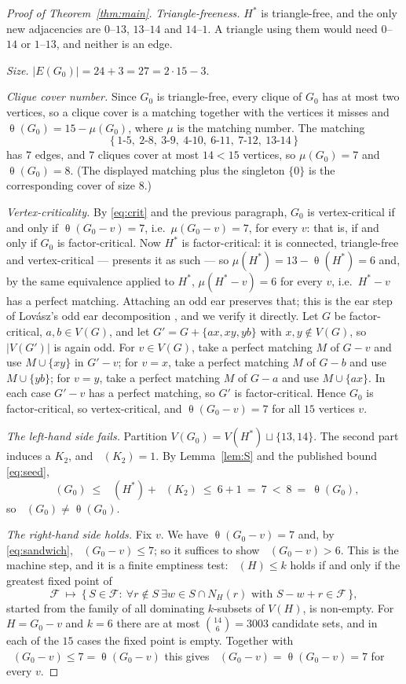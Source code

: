 \documentclass[11pt]{amsart}
\theoremstyle{remark}
\DeclareMathOperator{\edom}{\gamma^{\infty}}
\DeclareMathOperator{\thet}{\theta}
\newcommand{\Gz}{G_0}
\newcommand{\Hs}{H^{*}}
\begin{document}
\begin{proof}[Proof of Theorem~\ref{thm:main}]
\emph{Triangle-freeness.} $\Hs$ is triangle-free, and the only new adjacencies are $0$--$13$,
$13$--$14$ and $14$--$1$. A triangle using them would need $0$--$14$ or $1$--$13$, and neither is
an edge.

\emph{Size.} $|E(\Gz)|=24+3=27=2\cdot 15-3$.

\emph{Clique cover number.} Since $\Gz$ is triangle-free, every clique of $\Gz$ has at most two
vertices, so a clique cover is a matching together with the vertices it misses and
$\thet(\Gz)=15-\mu(\Gz)$, where $\mu$ is the matching number. The matching
\[
  \{\,1\text{-}5,\ 2\text{-}8,\ 3\text{-}9,\ 4\text{-}10,\ 6\text{-}11,\ 7\text{-}12,\
  13\text{-}14\,\}
\]
has $7$ edges, and $7$ cliques cover at most $14<15$ vertices, so $\mu(\Gz)=7$ and
$\thet(\Gz)=8$. (The displayed matching plus the singleton $\{0\}$ is the corresponding cover of
size $8$.)

\emph{Vertex-criticality.} By \eqref{eq:crit} and the previous paragraph, $\Gz$ is
vertex-critical if and only if $\thet(\Gz-v)=7$, i.e.\ $\mu(\Gz-v)=7$, for every $v$: that is,
if and only if $\Gz$ is factor-critical. Now $\Hs$ is factor-critical: it is connected,
triangle-free and vertex-critical --- \cite[Figure 2.1]{KMS} presents it as such --- so
$\mu(\Hs)=13-\thet(\Hs)=6$ and, by the same equivalence applied to $\Hs$, $\mu(\Hs-v)=6$ for
every $v$, i.e.\ $\Hs-v$ has a perfect matching. Attaching an odd ear preserves that; this is the
ear step of Lov\'asz's odd ear decomposition \cite{LP}, and we verify it directly. Let $G$ be
factor-critical, $a,b\in V(G)$, and let
$G'=G+\{ax,xy,yb\}$ with $x,y\notin V(G)$, so $|V(G')|$ is again odd. For $v\in V(G)$, take a
perfect matching $M$ of $G-v$ and use $M\cup\{xy\}$ in $G'-v$; for $v=x$, take a perfect
matching $M$ of $G-b$ and use $M\cup\{yb\}$; for $v=y$, take a perfect matching $M$ of $G-a$ and
use $M\cup\{ax\}$. In each case $G'-v$ has a perfect matching, so $G'$ is factor-critical. Hence
$\Gz$ is factor-critical, so vertex-critical, and $\thet(\Gz-v)=7$ for all $15$ vertices $v$.

\emph{The left-hand side fails.} Partition $V(\Gz)=V(\Hs)\sqcup\{13,14\}$. The second part
induces a $K_2$, and $\edom(K_2)=1$. By Lemma~\ref{lem:S} and the published bound
\eqref{eq:seed},
\[
  \edom(\Gz)\ \le\ \edom(\Hs)+\edom(K_2)\ \le\ 6+1\ =\ 7\ <\ 8\ =\ \thet(\Gz),
\]
so $\edom(\Gz)\ne\thet(\Gz)$.

\emph{The right-hand side holds.} Fix $v$. We have $\thet(\Gz-v)=7$ and, by
\eqref{eq:sandwich}, $\edom(\Gz-v)\le 7$; so it suffices to show $\edom(\Gz-v)>6$. This is the
machine step, and it is a finite emptiness test: $\edom(H)\le k$ holds if and only if the
greatest fixed point of
\[
  \mathcal F\ \longmapsto\
  \bigl\{\,S\in\mathcal F:\ \forall r\notin S\ \exists w\in S\cap N_H(r)
  \text{ with } S-w+r\in\mathcal F \,\bigr\},
\]
started from the family of all dominating $k$-subsets of $V(H)$, is non-empty. For
$H=\Gz-v$ and $k=6$ there are at most $\binom{14}{6}=3003$ candidate sets, and in each of the
$15$ cases the fixed point is empty. Together with $\edom(\Gz-v)\le7=\thet(\Gz-v)$ this gives
$\edom(\Gz-v)=\thet(\Gz-v)=7$ for every $v$.


\end{proof}
\end{document}
